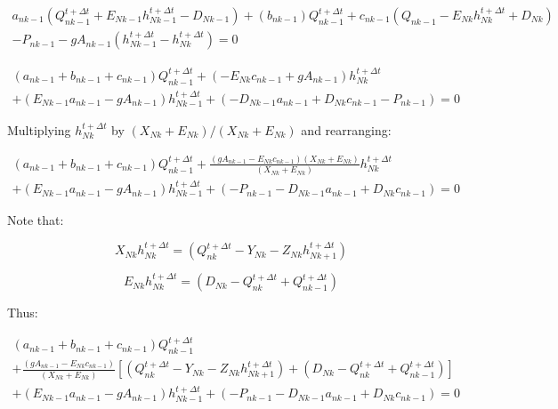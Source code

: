 \documentclass[11pt]{article}
\begin{document}
\begin{equation}
  \begin{split}
    a_{nk - 1} (Q_{nk - 1}^{t + \Delta t} + E_{Nk - 1} h_{Nk - 1}^{t + \Delta t}
    - D_{Nk - 1}) + (b_{nk - 1}) Q_{nk - 1}^{t + \Delta t} + c_{nk - 1} (Q_{nk -
      1} - E_{Nk} h_{Nk}^{t + \Delta t} + D_{Nk}) \\ - P_{nk - 1} - g A_{nk - 1}
    (h_{Nk - 1}^{t + \Delta t} - h_{Nk}^{t + \Delta t}) = 0
  \end{split}
\end{equation}

\begin{equation}
  \begin{split}
    (a_{nk - 1} + b_{nk - 1} + c_{nk - 1})  Q_{nk - 1}^{t + \Delta t} + ( - E_{Nk} c_{nk - 1} + g A_{nk - 1}) h_{Nk}^{t + \Delta t} \\ + (E_{Nk - 1} a_{nk - 1} - g A_{nk -1}) h_{Nk - 1}^{t + \Delta t}   
    + (- D_{Nk - 1} a_{nk - 1}   + D_{Nk} c_{nk - 1} - P_{nk - 1}) = 0 
  \end{split}
\end{equation}

Multiplying $h_{Nk}^{t + \Delta t}$ by $(X_{Nk} + E_{Nk}) / (X_{Nk} + E_{Nk})$
and rearranging:

\begin{equation}
  \begin{split}
    (a_{nk - 1} + b_{nk - 1} + c_{nk - 1})  Q_{nk - 1}^{t + \Delta t} + \frac{( g A_{nk - 1} - E_{Nk} c_{nk - 1} ) (X_{Nk} + E_{Nk}) }{(X_{Nk} + E_{Nk})} h_{Nk}^{t + \Delta t} \\ + (E_{Nk - 1} a_{nk - 1} - g A_{nk -1}) h_{Nk - 1}^{t + \Delta t}   
    + ( - P_{nk - 1} - D_{Nk - 1} a_{nk - 1}   + D_{Nk} c_{nk - 1} ) = 0 
  \end{split}
\end{equation}

Note that:

\begin{equation}
X_{Nk} h_{Nk}^{t + \Delta t} = (Q_{nk}^{t + \Delta t} - Y_{Nk} - Z_{Nk}
h_{Nk + 1}^{t + \Delta t})
\end{equation}

\begin{equation}
E_{Nk} h_{Nk}^{t + \Delta t} = (D_{Nk} -
Q_{nk}^{t + \Delta t} + Q_{nk - 1}^{t + \Delta t})
\end{equation}

Thus:

\begin{equation}
  \begin{split}
    (a_{nk - 1} + b_{nk - 1} + c_{nk - 1})  Q_{nk - 1}^{t + \Delta t} \\ + \frac{( g A_{nk - 1} - E_{Nk} c_{nk - 1} )}{(X_{Nk} + E_{Nk})} [(Q_{nk}^{t + \Delta t} - Y_{Nk} - Z_{Nk} h_{Nk + 1}^{t + \Delta t}) + (D_{Nk} - Q_{nk}^{t + \Delta t} + Q_{nk - 1}^{t + \Delta t})] \\ + (E_{Nk - 1} a_{nk - 1} - g A_{nk -1}) h_{Nk - 1}^{t + \Delta t}   
    + ( - P_{nk - 1} - D_{Nk - 1} a_{nk - 1}   + D_{Nk} c_{nk - 1} ) = 0 
  \end{split}
\end{equation}
\end{document}
